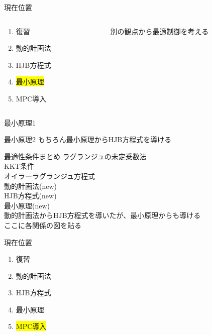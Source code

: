 \documentclass[dvipdfmx,12pt]{beamer}
\begin{document}
    \begin{frame}{現在位置}
        \footnotesize
        \begin{columns}
            \begin{column}{.35\textwidth}
                \begin{enumerate}
                    \item 復習
                    \item 動的計画法
                    \item HJB方程式
                    \item \colorbox{yellow}{最小原理}
                    \item MPC導入
                \end{enumerate}
            \end{column}
    
            \begin{column}{.7\textwidth}
                別の観点から最適制御を考える \\
            \end{column}
        \end{columns}
    \end{frame}

    \begin{frame}{最小原理1}
        \footnotesize

    \end{frame}

    \begin{frame}{最小原理2}
        \footnotesize
        もちろん最小原理からHJB方程式を導ける

    \end{frame}

    \begin{frame}{最適性条件まとめ}
        \footnotesize
        ラグランジュの未定乗数法\\
        KKT条件\\
        オイラーラグランジュ方程式\\
        動的計画法(new)\\
        HJB方程式(new)\\
        最小原理(new)\\
        動的計画法からHJB方程式を導いたが、最小原理からも導ける\\

        ここに各関係の図を貼る
    \end{frame}
    \begin{frame}{現在位置}
        \footnotesize
        \begin{enumerate}
            \item 復習
            \item 動的計画法
            \item HJB方程式
            \item 最小原理
            \item \colorbox{yellow}{MPC導入}
        \end{enumerate}
    \end{frame}
\end{document}
